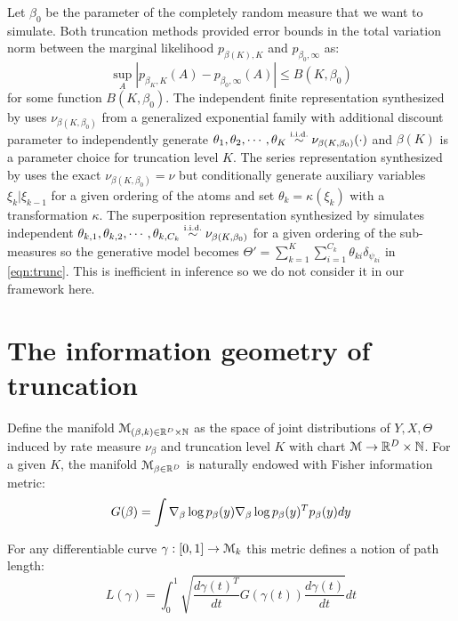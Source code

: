 \documentclass[letterpaper]{article}
\begin{document}
Let $\beta_0$ be the parameter of the completely random measure that we want to simulate. Both truncation methods provided error bounds in the total variation norm between the marginal likelihood $p_{\beta(K),K}$ and $p_{\beta_0,\infty}$ as:
\[
	\sup_A\left|p_{\beta_K,K}(A)-p_{\beta_0,\infty}(A)\right|\le B(K,\beta_0)
\]
for some function $B(K,\beta_0)$. The independent finite representation synthesized by \cite{nguyen20} uses $\nu_{\beta(K,\beta_0)}$ from a generalized exponential family \cite{broderick18} with additional discount parameter to independently generate $\theta_1,\theta_2,\cdots,\theta_K\distiid\nu_{\beta(K,\beta_0)}(\cdot)$ and $\beta(K)$ is a parameter choice for truncation level  $K$. The series representation synthesized by \cite{campbell19} uses the exact $\nu_{\beta(K,\beta_0)}=\nu$ but conditionally generate auxiliary variables $\xi_k|\xi_{k-1}$ for a given ordering of the atoms and set $\theta_k=\kappa(\xi_k)$ with a transformation $\kappa$. The superposition representation synthesized by \cite{campbell19} simulates independent $\theta_{k,1},\theta_{k,2},\cdots,\theta_{k,C_k}\distiid\nu_{\beta(K,\beta_0)}$ for a given ordering of the sub-measures so the generative model becomes $\Theta'=\sum_{k=1}^K\sum_{i=1}^{C_k}\theta_{ki}\delta_{\psi_{ki}}$ in \ref{eqn:trunc}. This is inefficient in inference \cite{zhu20,nguyen20} so we do not consider it in our framework here. 

\section{The information geometry of truncation}

Define the manifold $\mathcal{M}_{(\beta,k)\in\mathbb{R}^D\times\mathbb{N}}$ as the space of  joint distributions of $Y,X,\Theta$ induced by rate measure $\nu_\beta$ and truncation level $K$ with chart $\mathcal{M}\rightarrow\mathbb{R}^D\times\mathbb{N}$.  For a given $K$, the manifold $\mathcal{M}_{\beta\in\mathbb{R}^D}$ is naturally endowed with Fisher information metric:
\[
	G(\beta)=\int\nabla_\beta\log p_\beta(y)\nabla_\beta\log p_\beta(y)^Tp_\beta(y)dy
\]

For any differentiable curve $\gamma:[0,1]\rightarrow\mathcal{M}_k$ this metric defines a notion of path length:
\[
	L(\gamma)=\int_0^1\sqrt{\frac{d\gamma(t)^T}{dt}G(\gamma(t))\frac{d\gamma(t)}{dt}}dt
\]



{
\small


}
\end{document}
